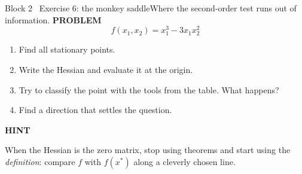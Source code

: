 \documentclass[aspectratio=169,11pt]{beamer}
\newcommand{\kicker}[1]{{\color{hseaccent}\scriptsize\bfseries\MakeUppercase{#1}}}
\newcommand{\takeaway}[2]{%
  \par\smallskip\noindent
  \colorbox{hselight}{\parbox{\dimexpr\textwidth-2\fboxsep}{%
    \kicker{#1}\par\vspace{0.12em}\footnotesize #2}}\par}
\begin{document}
\begin{frame}{Block 2 \textperiodcentered\ Exercise 6: the monkey saddle}{Where the second-order test runs out of information.}
  \vspace{0.5em}
  \kicker{problem}
  \[ f(x_1,x_2)=x_1^{3}-3x_1x_2^{2} \]
  \vspace{-0.4em}
  \begin{enumerate}\small
    \item Find all stationary points.
    \item Write the Hessian and evaluate it at the origin.
    \item Try to classify the point with the tools from the table. What happens?
    \item Find a direction that settles the question.
  \end{enumerate}
  \vspace{0.5em}
  \takeaway{hint}{When the Hessian is the zero matrix, stop using theorems and start using the
    \emph{definition}: compare $f$ with $f(x^\ast)$ along a cleverly chosen line.}
\end{frame}
\end{document}
